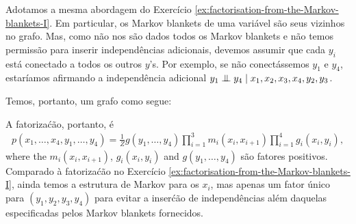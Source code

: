 \begin{solution}
    Adotamos a mesma abordagem do Exerc\'icio
    \ref{ex:factorisation-from-the-Markov-blankets-I}. Em particular, os
    Markov blankets de uma vari\'avel s\~ao seus vizinhos no grafo. Mas,
    como n\~ao nos s\~ao dados todos os Markov blankets e n\~ao temos permiss\~ao para
    inserir independ\^encias adicionais, devemos assumir que cada $y_i$ est\'a
    conectado a todos os outros $y$'s. Por exemplo, se n\~ao conect\'assemos
    $y_1$ e $y_4$, estar\'iamos afirmando a independ\^encia adicional $y_1
    \mathrel{\perp\mspace{-10mu}\perp} y_4 \mid x_1,x_2,x_3,x_4,y_2,y_3$.
    
    Temos, portanto, um grafo como segue:
    
    \begin{center}
    \end{center}
    
    A fatoriza\'c\~ao, portanto, \'e
    \begin{align}
        p(x_1, \ldots, x_4, y_1, \ldots, y_4) = \frac{1}{Z} g(y_1, \ldots, y_4) \prod_{i=1}^3 m_i(x_i,x_{i+1})\prod_{i=1}^4 g_i(x_i,y_i),
    \end{align}
    where the $m_i(x_i, x_{i+1})$, $g_i(x_i, y_i)$ and $g(y_1, \ldots, y_4)$ s\~ao fatores positivos. Comparado \`a fatoriza\'c\~ao no Exerc\'icio
    \ref{ex:factorisation-from-the-Markov-blankets-I}, ainda temos a
    estrutura de Markov para os $x_i$, mas apenas um fator \'unico para $(y_1,
    y_2, y_3, y_4)$ para evitar a inser\'c\~ao de independ\^encias al\'em daquelas
    especificadas pelos Markov blankets fornecidos.
    
    
\end{solution}


